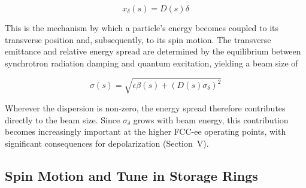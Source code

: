 \documentclass[%
 aip,
 amsmath,amssymb,
 reprint,%
superscriptaddress
]{revtex4-2}
\begin{document}
\begin{equation}
x_\delta (s)=D(s)\delta
\end{equation}

This is the mechanism by which a particle's energy becomes coupled to its transverse position and, subsequently, to its spin motion.
The transverse emittance and relative energy spread are determined by the equilibrium between synchrotron radiation damping and quantum excitation\cite{sands}, yielding a beam size of

\begin{equation}
\sigma (s)=\sqrt{\epsilon \beta (s) + (D(s)\sigma_\delta)^2}
\end{equation}

Wherever the dispersion is non-zero, the energy spread therefore contributes directly to the beam size. Since $\sigma_\delta$ grows with beam energy, this contribution becomes increasingly important at the higher FCC-ee operating points, with significant consequences for depolarization (Section~V).

\subsection{Spin Motion and Tune in Storage Rings}
\end{document}
